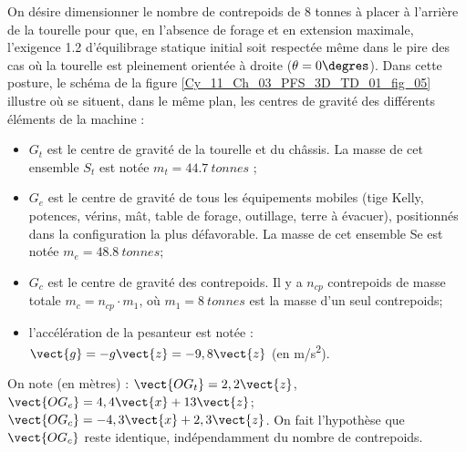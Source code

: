 On désire dimensionner le nombre de contrepoids de 8 tonnes à 
placer à l’arrière de la tourelle pour que, en l’absence de forage 
et en extension maximale, l’exigence 1.2 d’équilibrage statique 
initial soit respectée même dans le pire des cas où la tourelle est 
pleinement orientée à droite ($\theta=0\degres$). Dans cette posture, le 
schéma de la figure \ref{Cy_11_Ch_03_PFS_3D_TD_01_fig_05} illustre où se situent, dans le même plan, 
les centres de gravité des différents éléments de la machine :  
\begin{itemize}
\item $G_t$ est le centre de gravité de la tourelle et du châssis. La 
masse de cet ensemble $S_t$ est notée $m_t = \SI{44,7}{tonnes}$ ; 
\item $G_e$ est le centre de gravité de tous les équipements mobiles 
(tige Kelly, potences, vérins, mât, table de forage, outillage, 
terre à évacuer), positionnés dans la configuration la plus 
défavorable. La masse de cet ensemble Se est notée 
$m_e = \SI{48,8}{tonnes}$; 
\item $G_c$ est le centre de gravité des contrepoids. Il y a $n_{cp}$ 
contrepoids de masse totale $m_c = n_{cp}\cdot m_1$, où $m_1 = \SI{8}{tonnes}$
est la masse d’un seul contrepoids; 
\item l’accélération de la pesanteur est notée : $\vect{g}=-g\vect{z}=-9,8\vect{z}$
(en \si{m/s^2}).
\end{itemize} 
On note (en mètres) : $\vect{OG_t}=2,2\vect{z}$, $\vect{OG_e}=4,4\vect{x}+13\vect{z}$; $\vect{OG_c}=-4,3\vect{x}+2,3\vect{z}$. On fait l'hypothèse que $\vect{OG_c}$ reste identique, indépendamment du nombre de contrepoids. 

\ifprof
\begin{corrige}
\end{corrige}
\else
\fi